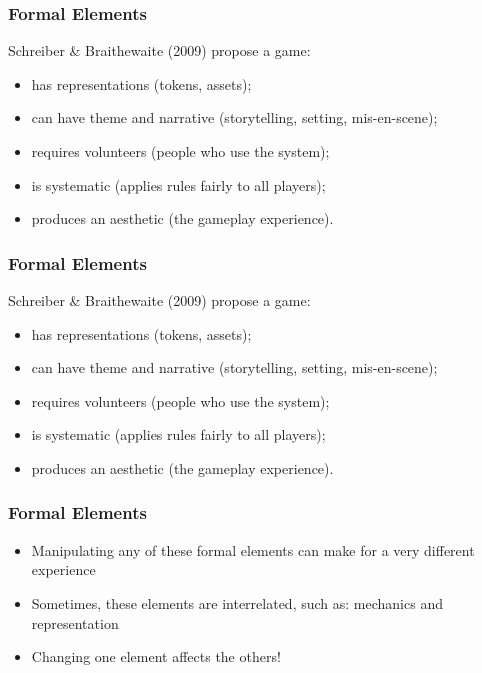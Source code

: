 \begin{frame}
	\frametitle{Formal Elements}
	
	Schreiber \& Braithewaite (2009) propose a game:
	
	\begin{itemize}
		\item has representations (tokens, assets);
		\item can have theme and narrative (storytelling, setting, mis-en-scene);
		\item requires volunteers (people who use the system);
		\item is systematic (applies rules fairly to all players);
		\item produces an aesthetic (the gameplay experience).
	\end{itemize}

\end{frame}

\begin{frame}
	\frametitle{Formal Elements}
	
	Schreiber \& Braithewaite (2009) propose a game:
	
	\begin{itemize}
		\item has representations (tokens, assets);
		\item can have theme and narrative (storytelling, setting, mis-en-scene);
		\item requires volunteers (people who use the system);
		\item is systematic (applies rules fairly to all players);
		\item produces an aesthetic (the gameplay experience).
	\end{itemize}

\end{frame}

\begin{frame}
	\frametitle{Formal Elements}
		
	\begin{itemize}
		\item Manipulating any of these formal elements can make for a very different experience
		\item Sometimes, these elements are interrelated, such as: mechanics and representation
		\item Changing one element affects the others!
	\end{itemize}

\end{frame}

